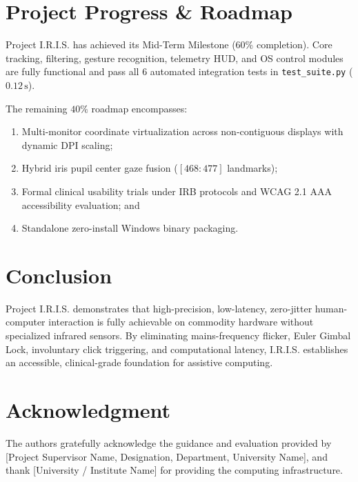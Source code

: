 \documentclass[conference]{IEEEtran}
\begin{document}
\section{Project Progress \& Roadmap}
Project I.R.I.S. has achieved its Mid-Term Milestone ($60\%$ completion). Core tracking, filtering, gesture recognition, telemetry HUD, and OS control modules are fully functional and pass all 6 automated integration tests in \texttt{test_suite.py} ($0.12\,\text{s}$).

The remaining $40\%$ roadmap encompasses:
\begin{enumerate}
    \item Multi-monitor coordinate virtualization across non-contiguous displays with dynamic DPI scaling;
    \item Hybrid iris pupil center gaze fusion ($[468:477]$ landmarks);
    \item Formal clinical usability trials under IRB protocols and WCAG 2.1 AAA accessibility evaluation; and
    \item Standalone zero-install Windows binary packaging.
\end{enumerate}

\section{Conclusion}
Project I.R.I.S. demonstrates that high-precision, low-latency, zero-jitter human-computer interaction is fully achievable on commodity hardware without specialized infrared sensors. By eliminating mains-frequency flicker, Euler Gimbal Lock, involuntary click triggering, and computational latency, I.R.I.S. establishes an accessible, clinical-grade foundation for assistive computing.

\section*{Acknowledgment}
The authors gratefully acknowledge the guidance and evaluation provided by [Project Supervisor Name, Designation, Department, University Name], and thank [University / Institute Name] for providing the computing infrastructure.
\end{document}
